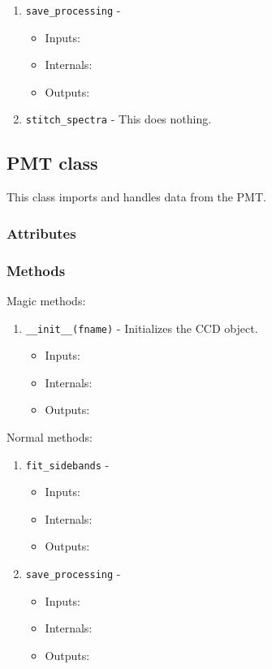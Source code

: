 \documentclass{article}
\newcommand{\code}{\texttt}
\begin{document}
\begin{enumerate}
	\item \code{save\_processing} - 
	\begin{itemize}
		\item Inputs:
		\item Internals:
		\item Outputs:
	\end{itemize}
	
	\item \code{stitch\_spectra} - This does nothing.
\end{enumerate}

\subsection{PMT class}
\indent \indent This class imports and handles data from the PMT. 
\subsubsection{Attributes}
\subsubsection{Methods}
Magic methods:
\begin{enumerate}
	\item \code{\_\_init\_\_(fname)} - Initializes the CCD object. 
	\begin{itemize}
		\item Inputs:
		\item Internals:
		\item Outputs:
	\end{itemize}
\end{enumerate}

\noindent Normal methods:
\begin{enumerate}
	\item \code{fit\_sidebands} - 
	\begin{itemize}
		\item Inputs:
		\item Internals:
		\item Outputs:
	\end{itemize}
	
	\item \code{save\_processing} - 
	\begin{itemize}
		\item Inputs:
		\item Internals:
		\item Outputs:
	\end{itemize}
\end{enumerate}
\end{document}

